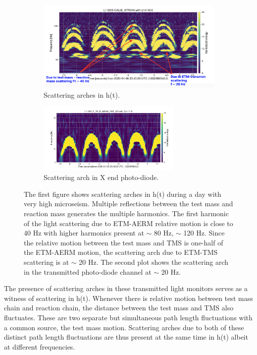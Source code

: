 \documentclass[12pt]{iopart}
\begin{document}
\begin{figure}[h]
   \centering
    \begin{subfigure}[b]{0.45\textwidth}
        \centering
         \includegraphics[width= \textwidth]{1262389546darm.png}
         \caption{Scattering arches in h(t).}
         \label{fig:1262darm}
    \end{subfigure}
    \begin{subfigure}[b]{0.45\textwidth}
        \centering
         \includegraphics[width =\textwidth,height=3.4cm]{1262389546trans1.png}
         \caption{Scattering arch in X end photo-diode.}
         \label{fig:1262trans}
         
    
    \end{subfigure}
    \caption{The first figure shows scattering arches in h(t) during a day with very high microseism. Multiple reflections between the test mass and reaction mass generates the multiple harmonics. The first harmonic of the light scattering due to ETM-AERM relative motion is close to 40 Hz with higher harmonics present at $\sim$ 80 Hz, $\sim$ 120 Hz. Since the relative motion between the test mass and TMS is one-half of the ETM-AERM motion, the scattering arch due to ETM-TMS scattering is at $\sim$ 20 Hz. The second plot shows the scattering arch in the transmitted photo-diode channel at $\sim$ 20 Hz.}
    \label{fig:1262scat}
    
\end{figure}
The presence of scattering arches in these transmitted light monitors serves as a witness of scattering in h(t). Whenever there is relative motion between test mass chain and reaction chain, the distance between the test mass and TMS also fluctuates. These are two separate but simultaneous path length fluctuations with a common source, the test mass motion. Scattering arches due to both of these distinct path length fluctuations are thus present at the same time in h(t) albeit at different frequencies.
\end{document}
